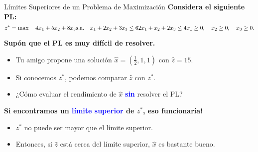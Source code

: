 \documentclass{beamer}
\begin{document}
\begin{frame}{Límites Superiores de un Problema de Maximización}
    \textbf{Considera el siguiente PL:}
    \[
    z^* = \max \quad 4x_1 + 5x_2 + 8x_3 \\
    \text{s.a.} \quad x_1 + 2x_2 + 3x_3 \leq 6 \\
    2x_1 + x_2 + 2x_3 \leq 4 \\
    x_1 \geq 0, \quad x_2 \geq 0, \quad x_3 \geq 0.
    \]
    
    \vspace{0.3cm}
    \textbf{Supón que el PL es muy difícil de resolver.}
    \begin{itemize}
        \item Tu amigo propone una solución \(\hat{x} = \left(\frac{1}{2}, 1, 1\right)\) con \(\hat{z} = 15\).
        \item Si conocemos \( z^* \), podemos comparar \(\hat{z}\) con \( z^* \).
        \item ¿Cómo evaluar el rendimiento de \(\hat{x}\) \textbf{\textcolor{blue}{sin}} resolver el PL?
    \end{itemize}
    
    \vspace{0.3cm}
    \textbf{Si encontramos un \textcolor{blue}{límite superior} de \( z^* \), eso funcionaría!}
    \begin{itemize}
        \item \( z^* \) no puede ser mayor que el límite superior.
        \item Entonces, si \(\hat{z}\) está cerca del límite superior, \(\hat{x}\) es bastante bueno.
    \end{itemize}

\end{frame}
\end{document}
